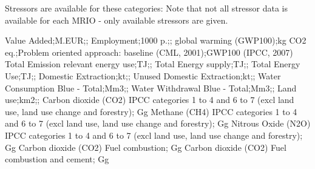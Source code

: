 Stressors are available for these categories:
Note that not all stressor data is available for each MRIO - only available stressors are given.

Value Added;M.EUR;;
Employment;1000 p.;;
global warming (GWP100);kg CO2 eq.;Problem oriented approach: baseline (CML, 2001);GWP100 (IPCC, 2007)
Total Emission relevant energy use;TJ;;
Total Energy supply;TJ;;
Total Energy Use;TJ;;
Domestic Extraction;kt;;
Unused Domestic Extraction;kt;;
Water Consumption Blue - Total;Mm3;;
Water Withdrawal Blue - Total;Mm3;;
Land use;km2;;
Carbon dioxide (CO2) IPCC categories 1 to 4 and 6 to 7 (excl land use, land use change and forestry); Gg
Methane (CH4) IPCC categories 1 to 4 and 6 to 7 (excl land use, land use change and forestry); Gg
Nitrous Oxide (N2O) IPCC categories 1 to 4 and 6 to 7 (excl land use, land use change and forestry); Gg
Carbon dioxide (CO2) Fuel combustion; Gg
Carbon dioxide (CO2) Fuel combustion and cement; Gg

  
  